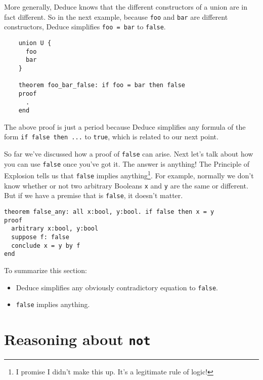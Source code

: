 \documentclass[12pt]{article}
\begin{document}
More generally, Deduce knows that the different constructors of a
union are in fact different. So in the next example, because
\texttt{foo} and \texttt{bar} are different constructors, Deduce
simplifies \texttt{foo = bar} to \texttt{false}.

\begin{verbatim}
    union U {
      foo
      bar
    }
    
    theorem foo_bar_false: if foo = bar then false
    proof
      .
    end
\end{verbatim}

The above proof is just a period because Deduce simplifies any formula
of the form \texttt{if false then ...} to \texttt{true}, which is
related to our next point.

So far we've discussed how a proof of \texttt{false} can arise.  Next
let's talk about how you can use \texttt{false} once you've got it.
The answer is anything! The Principle of Explosion tells us that
\texttt{false} implies anything\footnote{I promise I didn't make this
  up. It's a legitimate rule of logic!}. For example, normally we
don't know whether or not two arbitrary Booleans \texttt{x} and
\texttt{y} are the same or different.  But if we have a premise that
is \texttt{false}, it doesn't matter.

\begin{verbatim}
theorem false_any: all x:bool, y:bool. if false then x = y
proof
  arbitrary x:bool, y:bool
  suppose f: false
  conclude x = y by f
end
\end{verbatim}

To summarize this section:
\begin{itemize}
\item Deduce simplifies any obviously contradictory equation to \texttt{false}.
\item \texttt{false} implies anything.
\end{itemize}

\pagebreak

\section{Reasoning about \texttt{not}}
\label{sec:not}
\end{document}
